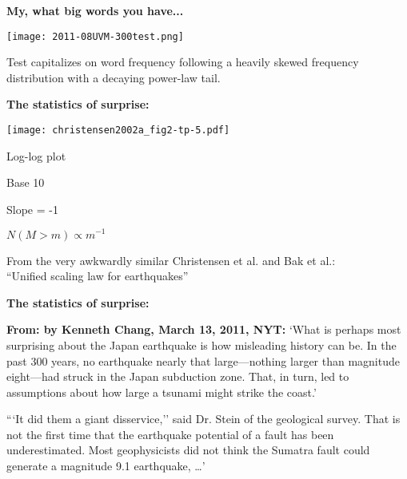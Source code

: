       



  \textbf{My, what big words you have...}

  
    \texttt{[image: 2011-08UVM-300test.png]}

    
    
      Test capitalizes on word frequency following a
      heavily skewed frequency distribution
      with a decaying power-law tail.
     
    
  



\textbf{The statistics of surprise:}


\textbf{}
      
    
    \texttt{[image: christensen2002a\_fig2-tp-5.pdf]}
    
    
     
      Log-log plot
     
      Base 10
     
      Slope = -1
    
    $N(M>m) \propto m^{-1}$
    
  


  
   
    From  the very awkwardly similar Christensen et al. and Bak et al.:\\
    ``Unified scaling law for earthquakes''\cite{christensen2002a,bak2002a}
  




\textbf{The statistics of surprise:}

\textbf{From:
by Kenneth Chang, March 13, 2011, NYT:
}
`What is perhaps most surprising about the Japan earthquake is how
misleading history can be. In the past 300 years, no earthquake nearly
that large---nothing larger than magnitude eight---had struck in the
Japan subduction zone. That, in turn, led to assumptions about how
large a tsunami might strike the coast.'



```It did them a giant disservice,'' said Dr. Stein of the geological
survey. That is not the first time that the earthquake potential of a
fault has been underestimated. Most geophysicists did not think the
Sumatra fault could generate a magnitude 9.1 earthquake, \ldots'





